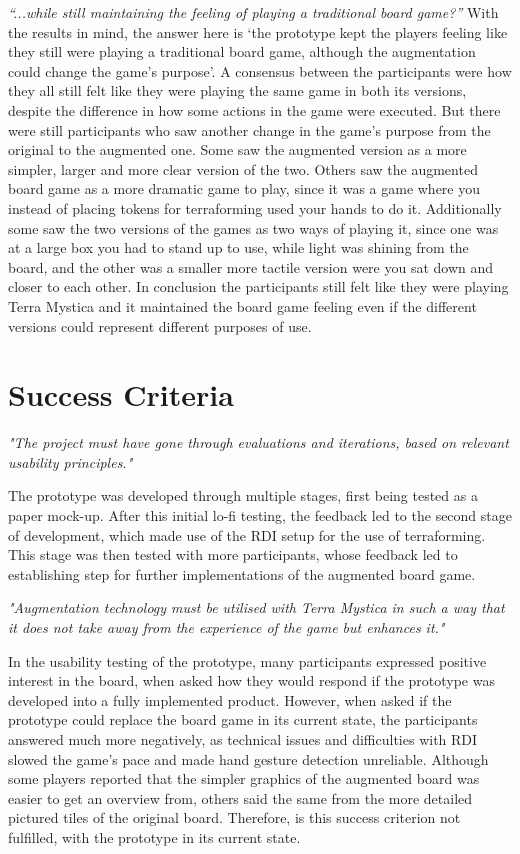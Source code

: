 \textit{“...while still maintaining the feeling of playing a traditional board game?”} With the results in mind, the answer here is ‘the prototype kept the players feeling like they still were playing a traditional board game, although the augmentation could change the game’s purpose’. A consensus between the participants were how they all still felt like they were playing the same game in both its versions, despite the difference in how some actions in the game were executed. But there were still participants who saw another change in the game’s purpose from the original to the augmented one. Some saw the augmented version as a more simpler, larger and more clear version of the two. Others saw the augmented board game as a more dramatic game to play, since it was a game where you instead of placing tokens for terraforming used your hands to do it. Additionally some saw the two versions of the games as two ways of playing it, since one was at a large box you had to stand up to use, while light was shining from the board, and the other was a smaller more tactile version were you sat down and closer to each other. In conclusion the participants still felt like they were playing Terra Mystica and it maintained the board game feeling even if the different versions could represent different purposes of use.

\section{Success Criteria}
\textit{"The project must have gone through evaluations and iterations, based on relevant usability principles."}

The prototype was developed through multiple stages, first being tested as a paper mock-up. After this initial lo-fi testing, the feedback led to the second stage of development, which made use of the RDI setup for the use of terraforming. This stage was then tested with more participants, whose feedback led to establishing step for further implementations of the augmented board game.

\textit{"Augmentation technology must be utilised with Terra Mystica in such a way that it does not take away from the experience of the game but enhances it."}

In the usability testing of the prototype, many participants expressed positive interest in the board, when asked how they would respond if the prototype was developed into a fully implemented product. However, when asked if the prototype could replace the board game in its current state, the participants answered much more negatively, as technical issues and difficulties with RDI slowed the game’s pace and made hand gesture detection unreliable. Although some players reported that the simpler graphics of the augmented board was easier to get an overview from, others said the same from the more detailed pictured tiles of the original board. Therefore, is this success criterion not fulfilled, with the prototype in its current state.

